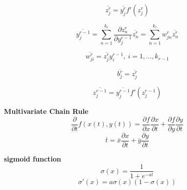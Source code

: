 \documentclass{article}
\begin{document}
\begin{multicols}{2}
\[\overline{z_j^r} = \overline{y_j^r} f'(z_j^r)\]

\[\overline{y_j^{r-1}} = \sum_{n=1}^{k_{r}} \frac{\partial z_n^r}{\partial y_j^{r-1}} \overline{z_n^r} = \sum_{n=1}^{k_{r}} w_{jn}^r \overline{z_n^r}\]

\[\overline{w_{ji}^r} = \overline{z_j^r} y_i^{r-1},\ i=1, \ldots, k_{r-1}\]

\[\overline{b_j^r} = \overline{z_j^r}\]

\[\overline{z_j^{r-1}} = \overline{y_j^{r-1}} f'(z_j^{r-1})\]

\textbf{Multivariate Chain Rule}
\[\frac{\partial}{\partial t} f(x(t), y(t)) = \frac{\partial f}{\partial x} \frac{\partial x}{\partial t} + \frac{\partial f}{\partial y} \frac{\partial y}{\partial t}\]
\[\overline{t} = \overline{x} \frac{\partial x}{\partial t} + \overline{y} \frac{\partial y}{\partial t}\]

\textbf{sigmoid function}
\[\sigma(x) = \frac{1}{1+e^{-at}}\]
\[\sigma'(x) = a \sigma(x) (1-\sigma(x))\]


\end{multicols}
\end{document}
